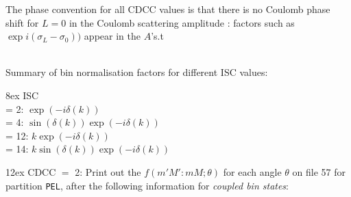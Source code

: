 \documentclass[11pt]{article}
\begin{document}
The phase convention for all CDCC values is that there is no Coulomb phase shift
for $L = 0$ in the Coulomb scattering amplitude : factors such as
$\exp i(\sigma_L-\sigma_0))$  appear in the $A$'s.t

~\\
Summary of bin normalisation factors for different ISC values:

\hangindent 8ex
ISC
\\ = 2:  $\exp(-i\delta(k))$
\\ = 4:  $\sin(\delta(k))\exp(-i\delta(k))$
\\ = 12:  $k\exp(-i\delta(k))$
\\ = 14:  $k\sin(\delta(k))\exp(-i\delta(k))$

\newpage
\hangindent 12ex
CDCC  $=$ 2:
Print out the $f(m'M':mM; \theta)$ for each angle $\theta$
on file 57 for partition {\tt PEL}, after the following information for {\em coupled bin states}:
\end{document}
